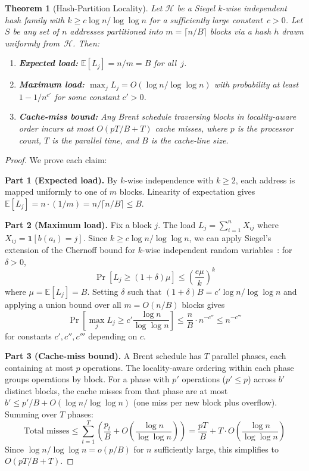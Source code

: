 \documentclass[11pt]{article}
\newtheorem{theorem}{Theorem}
\begin{document}
\begin{theorem}[Hash-Partition Locality]
\label{thm:hash-partition}
Let $\mathcal{H}$ be a Siegel $k$-wise independent hash family with
$k \ge c\log n / \log\log n$ for a sufficiently large constant~$c > 0$.
Let $S$ be any set of $n$ addresses partitioned into $m = \lceil n/B
\rceil$ blocks via a hash $h$ drawn uniformly from~$\mathcal{H}$.  Then:
\begin{enumerate}
\item \textbf{Expected load:} $\mathbb{E}[L_j] = n/m = B$ for all~$j$.
\item \textbf{Maximum load:} $\max_j L_j = O(\!\log n / \log\log n)$
  with probability at least $1 - 1/n^{c'}$ for some constant $c' > 0$.
\item \textbf{Cache-miss bound:} Any Brent schedule traversing blocks in
  locality-aware order incurs at most
  $O(pT/B + T)$ cache misses, where $p$ is the processor count, $T$ is
  the parallel time, and $B$ is the cache-line size.
\end{enumerate}
\end{theorem}

\begin{proof}
We prove each claim:

\textbf{Part 1 (Expected load).}
By $k$-wise independence with $k \ge 2$, each address is mapped uniformly
to one of $m$ blocks.  Linearity of expectation gives
$\mathbb{E}[L_j] = n \cdot (1/m) = n / \lceil n/B \rceil \le B$.

\textbf{Part 2 (Maximum load).}
Fix a block $j$.  The load $L_j = \sum_{i=1}^n X_{ij}$ where
$X_{ij} = \mathbf{1}[b(a_i) = j]$.  Since $k \ge c\log n/\log\log n$,
we can apply Siegel's extension of the Chernoff bound for $k$-wise
independent random variables~\cite{siegel2004hash,
schmidt1995chernoff}: for $\delta > 0$,
\[
  \Pr\!\left[L_j \ge (1+\delta)\mu\right]
  \le \left(\frac{e\mu}{k}\right)^k
\]
where $\mu = \mathbb{E}[L_j] = B$.
Setting $\delta$ such that $(1+\delta)B = c'\log n/\log\log n$ and
applying a union bound over all $m = O(n/B)$ blocks gives
\[
  \Pr\!\left[\max_j L_j \ge c'\frac{\log n}{\log\log n}\right]
  \le \frac{n}{B} \cdot n^{-c''} \le n^{-c'''}
\]
for constants $c', c'', c'''$ depending on $c$.

\textbf{Part 3 (Cache-miss bound).}
A Brent schedule has $T$ parallel phases, each containing at most $p$
operations.  The locality-aware ordering within each phase groups
operations by block.  For a phase with $p'$ operations ($p' \le p$)
across $b'$ distinct blocks, the cache misses from that phase are at
most $b' \le p'/B + O(\!\log n/\log\log n)$ (one miss per new block
plus overflow).  Summing over $T$ phases:
\[
  \text{Total misses} \le \sum_{t=1}^T \left(\frac{p_t}{B} +
  O\!\left(\frac{\log n}{\log\log n}\right)\right)
  = \frac{pT}{B} + T \cdot O\!\left(\frac{\log n}{\log\log n}\right)
\]
Since $\log n/\log\log n = o(p/B)$ for $n$ sufficiently large, this
simplifies to $O(pT/B + T)$.
\end{proof}
\end{document}
